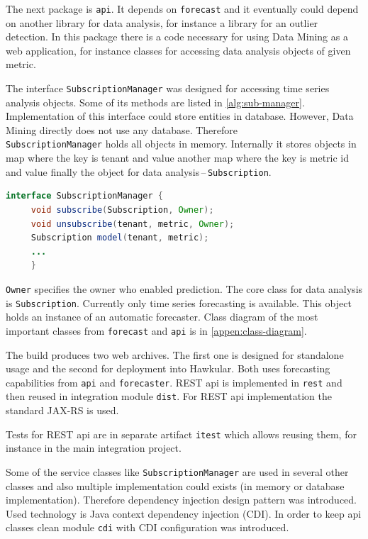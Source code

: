     The next package is \texttt{api}. It depends on \texttt{forecast} and it eventually could
    depend on another library for data analysis, for instance a library for an outlier detection. In this package there
    is a code necessary for using Data Mining as a web application, for instance classes for accessing data analysis
    objects of given metric.

    The interface \texttt{SubscriptionManager} was designed for accessing time series analysis objects. Some of its
    methods are listed in \ref{alg:sub-manager}. Implementation of this interface could store entities in database.
    However, Data Mining directly does not use any database. Therefore \\ \texttt{SubscriptionManager} holds all objects
    in memory. Internally it stores objects in map where the key is tenant and value another map where the key is
    metric id and value finally the object for data analysis\,--\,\texttt{Subscription}.

    \begin{lstlisting}[caption={Interface \texttt{SubscriptionManager}.}, language=Java, label={alg:sub-manager}]
interface SubscriptionManager {
     void subscribe(Subscription, Owner);
     void unsubscribe(tenant, metric, Owner);
     Subscription model(tenant, metric);
     ...
     }
    \end{lstlisting}

    \texttt{Owner} specifies the owner who enabled prediction. The core class for data analysis is
    \texttt{Subscription}. Currently only time series forecasting is available.
    This object holds an instance of an automatic forecaster. Class diagram of the most important classes
    from \texttt{forecast} and \texttt{api} is in \ref{appen:class-diagram}.

    The build produces two web archives. The first one is designed for standalone usage and the second for deployment
    into Hawkular. Both uses forecasting capabilities from \texttt{api} and \texttt{forecaster}.
    REST api is implemented in \texttt{rest} and then reused in integration module \texttt{dist}.
    For REST api implementation the standard JAX-RS is used.

    Tests for REST api are in separate artifact \texttt{itest} which allows reusing them, for instance in the main
    integration project.

    Some of the service classes like \texttt{SubscriptionManager} are used in several other classes and also multiple
    implementation could exists (in memory or database implementation). Therefore dependency injection
    design pattern was introduced. Used technology is Java context dependency injection (CDI). In order to keep
    api classes clean module \texttt{cdi} with CDI configuration was introduced.

